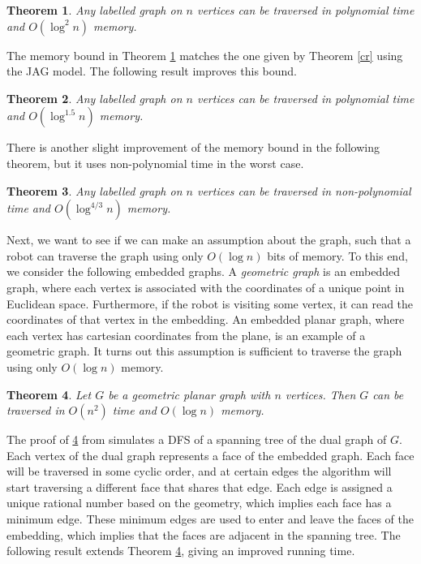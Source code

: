\documentclass[12pt,letterpaper,oneside]{book}
\newtheorem{theorem}{Theorem}[section]
\begin{document}
\begin{theorem}\label{l2}
\emph{\cite{BR}}  Any labelled graph on $n$ vertices can be traversed in polynomial time and $O(\log^2n)$ memory.
\end{theorem}

The memory bound in Theorem \ref{l2} matches the one given by Theorem \ref{cr} using the JAG model.  The following result improves 
this bound.  

\begin{theorem}\label{l15}
\emph{\cite{NSW}}  Any labelled graph on $n$ vertices can be traversed in polynomial time and $O(\log^{1.5} n)$ memory.
\end{theorem}

There is another slight improvement of the memory bound in the following theorem, but it uses non-polynomial time in the worst case.  

\begin{theorem}\label{l43}
\emph{\cite{ATWZ}}  Any labelled graph on $n$ vertices can be traversed in non-polynomial time and $O(\log^{4/3} n)$ memory.
\end{theorem}



Next, we want to see if we can make an assumption about the graph, such that a robot can 
traverse the graph using only $O(\log n)$ bits of memory.  
To this end, we consider the following embedded graphs.  
A \emph{geometric 
graph} is an embedded graph, where each vertex is 
associated with the coordinates of a unique point in Euclidean space.  Furthermore, if the robot is visiting some vertex, it can 
read the coordinates of that vertex in the embedding.  An embedded planar graph, 
where each vertex has cartesian coordinates from the plane, is an example of a geometric graph.  
It turns out this assumption is sufficient to traverse the graph using only $O(\log n)$ memory.  




\begin{theorem}\label{sq}
\emph{\cite{BKOO}}  Let $G$ be a geometric planar graph with $n$ vertices.  Then $G$ can be traversed 
in $O(n^2)$ time and $O(\log n)$ memory.  
\end{theorem}

The proof of \ref{sq} from \cite{BKOO} simulates a DFS of a spanning tree of the dual graph of $G$.  Each vertex of the dual 
graph represents a face of the embedded graph.  Each face will be traversed in some cyclic order, and at certain 
edges the algorithm will start traversing a different face that shares that edge.  Each 
edge is assigned a unique rational number based on the geometry, which implies each face has a minimum edge.  These minimum edges 
are used to enter and leave the faces of the embedding, which implies that 
the faces are adjacent in the spanning tree.  The following result extends Theorem \ref{sq}, giving an improved running time.  
\end{document}
